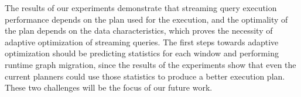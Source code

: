 The results of our experiments demonstrate that streaming query execution performance depends on the plan used for the execution, and the optimality of the plan depends on the data characteristics, which proves the necessity of adaptive optimization of streaming queries. The first steps towards adaptive optimization should be predicting statistics for each window and performing runtime graph migration, since the results of the experiments show that even the current planners could use those statistics to produce a better execution plan. These two challenges will be the focus of our future work.

